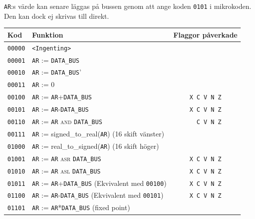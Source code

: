 \documentclass[]{article}
\begin{document}
\texttt{AR}:s värde kan senare läggas på bussen genom att ange koden \texttt{0101} i mikrokoden. Den kan dock ej skrivas till direkt.
\\
\begin{table}[H]
\centering
\begin{tabular}{llc}
	\textbf{Kod}    & \textbf{Funktion}                                                                & \textbf{Flaggor påverkade} \\ 
        \hline
	\texttt{00000}  & \texttt{<Ingenting>}                                                             &  \\
	\texttt{00001}  & \texttt{AR} := \texttt{DATA\_BUS}                                                &  \\
	\texttt{00010}  & \texttt{AR} := \texttt{DATA\_BUS}'                                               &  \\
	\texttt{00011}  & \texttt{AR} := 0                                                                 &  \\
	\texttt{00100}  & \texttt{AR} := \texttt{AR}+\texttt{DATA\_BUS}                                    &  \texttt{X C V N Z}     \\
	\texttt{00101}  & \texttt{AR} := \texttt{AR}-\texttt{DATA\_BUS}                                    &  \texttt{X C V N Z}     \\
	\texttt{00110}  & \texttt{AR} := \texttt{AR} \textsc{and} \texttt{DATA\_BUS}                       &  \texttt{{ } C V N Z}   \\
	\texttt{00111}  & \texttt{AR} := signed\_to\_real(\texttt{AR}) (16 skift vänster)                  &  \\
	\texttt{01000}  & \texttt{AR} := real\_to\_signed(\texttt{AR}) (16 skift höger)                    &  \\
	\texttt{01001}  & \texttt{AR} := \texttt{AR} \textsc{asr} \texttt{DATA\_BUS}                       &  \texttt{X C V N Z}     \\
	\texttt{01010}  & \texttt{AR} := \texttt{AR} \textsc{asl} \texttt{DATA\_BUS}                       &  \texttt{X C V N Z}     \\
	\texttt{01011}  & \texttt{AR} := \texttt{AR}+\texttt{DATA\_BUS} (Ekvivalent med \texttt{00100})    &  \texttt{X C V N Z}     \\
	\texttt{01100}  & \texttt{AR} := \texttt{AR}-\texttt{DATA\_BUS} (Ekvivalent med \texttt{00101})    &  \texttt{X C V N Z}     \\
	\texttt{01101}  & \texttt{AR} := \texttt{AR}*\texttt{DATA\_BUS} (fixed point)                      &  \\

\end{tabular}
\end{table}
\end{document}
